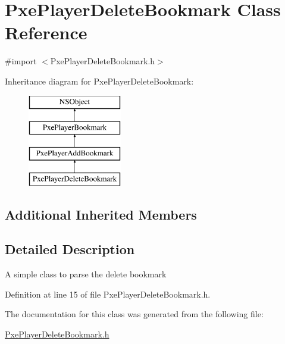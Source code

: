 \hypertarget{interface_pxe_player_delete_bookmark}{\section{Pxe\-Player\-Delete\-Bookmark Class Reference}
\label{interface_pxe_player_delete_bookmark}
}


{\ttfamily \#import $<$Pxe\-Player\-Delete\-Bookmark.\-h$>$}

Inheritance diagram for Pxe\-Player\-Delete\-Bookmark\-:\begin{figure}[H]
\begin{center}
\leavevmode
\includegraphics[height=4.000000cm]{interface_pxe_player_delete_bookmark}
\end{center}
\end{figure}
\subsection*{Additional Inherited Members}


\subsection{Detailed Description}
A simple class to parse the delete bookmark 

Definition at line 15 of file Pxe\-Player\-Delete\-Bookmark.\-h.



The documentation for this class was generated from the following file\-:\begin{DoxyCompactItemize}
\item 
\hyperlink{_pxe_player_delete_bookmark_8h}{Pxe\-Player\-Delete\-Bookmark.\-h}\end{DoxyCompactItemize}
